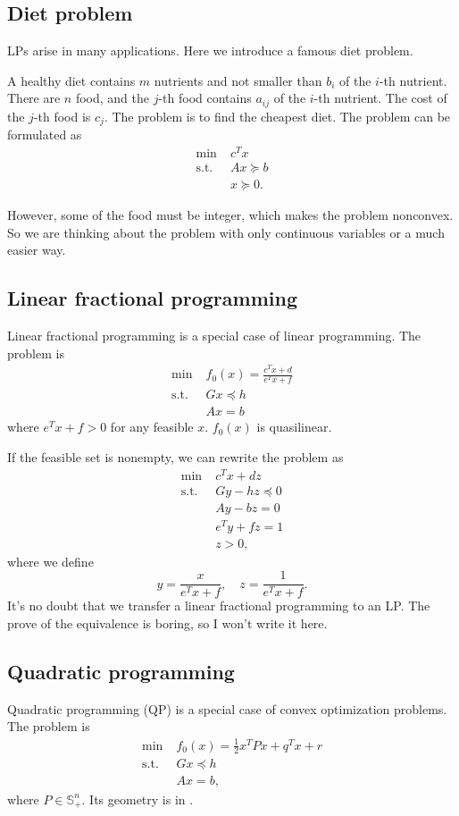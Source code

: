 \documentclass[lang=en,color=blue,mode=fancy,titlestyle=hang]{elegantbook}
\begin{document}
\subsection{Diet problem}

LPs arise in many applications. Here we introduce a famous diet problem.

A healthy diet contains $m$ nutrients and not smaller than $b_i$ of the $i$-th nutrient.
There are $n$ food, and the $j$-th food contains $a_{ij}$ of the $i$-th nutrient.
The cost of the $j$-th food is $c_j$. The problem is to find the cheapest diet.
The problem can be formulated as
\begin{align*}
\min \; &c^T x\\
\text{s.t.} \; &Ax \succeq b\\
&x \succeq 0.
\end{align*}

However, some of the food must be integer, which makes the problem nonconvex. So we are
thinking about the problem with only continuous variables or a much easier way.

\subsection{Linear fractional programming}

Linear fractional programming is a special case of linear programming. The problem is
\begin{align*}
\min \; &f_0(x) = \frac{c^T x + d}{e^T x + f}\\
\text{s.t.} \; &Gx \preceq h\\
&Ax = b
\end{align*}
where $e^T x + f > 0$ for any feasible $x$. $f_0(x)$ is quasilinear.

If the feasible set is nonempty, we can rewrite the problem as
\begin{align*}
\min \; &c^T x + dz\\
\text{s.t.} \; &Gy - hz \preceq 0\\
&Ay - bz = 0\\
&e^T y + fz = 1\\
&z > 0,
\end{align*}
where we define
\[
y = \frac{x}{e^T x + f}, \quad z = \frac{1}{e^T x + f}.
\]
It's no doubt that we transfer a linear fractional programming to an LP. The prove of
the equivalence is boring, so I won't write it here.

\subsection{Quadratic programming}
Quadratic programming (QP) is a special case of convex optimization problems. The problem is
\begin{align*}
\min \; &f_0(x) = \frac12 x^T P x + q^T x + r\\
\text{s.t.} \; &Gx \preceq h\\
&Ax = b,
\end{align*}
where $P \in \mathbb{S}^n_+$. Its geometry is in .
\end{document}
